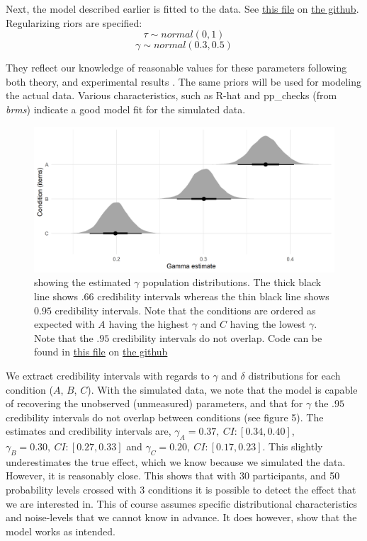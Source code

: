 \documentclass[12pt]{article}
\begin{document}
Next, the model described earlier is fitted
to the data. See
\href{https://github.com/victor-m-p/BayesianDecisionWeights/blob/main/Code/3_toy_model.Rmd}{this
file} on \href{https://github.com/victor-m-p/BayesianDecisionWeights}{the
github}. Regularizing riors are specified:
\[
	\tau \sim normal(0, 1)
\]
\[
	\gamma \sim normal(0.3, 0.5)
\]

They reflect our knowledge of reasonable values for
these parameters following both theory, and
experimental results \autocite{gonzalez1999shape}.
The same priors will be used for
modeling the actual data. Various characteristics,
such as R-hat and pp\_checks (from \emph{brms})
indicate a good model fit for the simulated data. \\

\begin{figure}[H]
	\includegraphics[width = \linewidth]{../Figures/gamma.png}
	\caption{showing the estimated  $\gamma$
	population distributions. The thick
	black line shows  $.66$ credibility intervals
	whereas the thin black line shows  $0.95$
	credibility intervals. Note that the
	conditions are ordered as expected with
	 $A$ having the highest  $\gamma$ and
	 $C$ having the lowest  $\gamma$.
	 Note that the  $.95$ credibility
	 intervals do not overlap. Code can
 be found in
 \href{https://github.com/victor-m-p/BayesianDecisionWeights/blob/main/Code/4_testing_hypotheses.Rmd}{this
 file} on \href{https://github.com/victor-m-p/BayesianDecisionWeights}{the
 github}}
 \end{figure}

We extract credibility intervals with regards
to $\gamma$ and $\delta$ distributions for each
condition ($A$, $B$, $C$). With the simulated
data, we note that the model is capable of
recovering the unobserved (unmeasured) parameters,
and that for $\gamma$ the  $.95$ credibility
intervals do not overlap between conditions
(see figure 5). The estimates and credibility intervals
are, $\gamma_{A} = 0.37, \: CI: [0.34, 0.40]$,
$\gamma_{B} = 0.30, \: CI: [0.27, 0.33]$ and
$\gamma_{C} = 0.20, \: CI: [0.17, 0.23]$.
This slightly underestimates the true effect, which
we know because we simulated the data. However, it
is reasonably close. This shows that with $30$
participants, and 50 probability levels crossed with
3 conditions it is possible to detect the effect
that we are interested in. This of course assumes specific
distributional characteristics and noise-levels
that we cannot know in advance. It does however, show
that the model works as intended.
\end{document}
